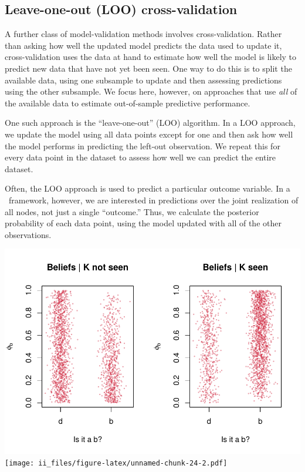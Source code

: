 \documentclass[
  12pt,
]{book}
\begin{document}
\hypertarget{leave-one-out-loo-cross-validation}{%
\subsection{Leave-one-out (LOO) cross-validation}\label{leave-one-out-loo-cross-validation}}

A further class of model-validation methods involves cross-validation. Rather than asking how well the updated model predicts the data used to update it, cross-validation uses the data at hand to estimate how well the model is likely to predict new data that have not yet been seen. One way to do this is to split the available data, using one subsample to update and then assessing predictions using the other subsample. We focus here, however, on approaches that use \emph{all} of the available data to estimate out-of-sample predictive performance.

One such approach is the ``leave-one-out'' (LOO) algorithm. In a LOO approach, we update the model using all data points except for one and then ask how well the model performs in predicting the left-out observation. We repeat this for every data point in the dataset to assess how well we can predict the entire dataset.

Often, the LOO approach is used to predict a particular outcome variable. In a \CausalQuery~framework, however, we are interested in predictions over the joint realization of all nodes, not just a single ``outcome.'' Thus, we calculate the posterior probability of each data point, using the model updated with all of the other observations.

\includegraphics{ii_files/figure-latex/unnamed-chunk-24-1.pdf} \texttt{[image: ii\_files/figure-latex/unnamed-chunk-24-2.pdf]}
\end{document}
